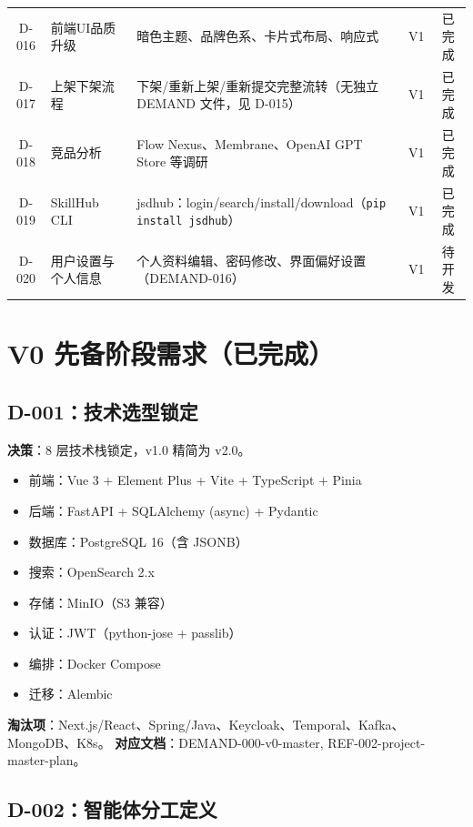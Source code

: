 \documentclass[11pt,a4paper]{article}
\begin{document}
\begin{table}[h]
\begin{tabular}{clp{4.5cm}cc}
D-016 & 前端UI品质升级 & 暗色主题、品牌色系、卡片式布局、响应式 & V1 & \textcolor{success}{已完成} \\
D-017 & 上架下架流程 & 下架/重新上架/重新提交完整流转（无独立 DEMAND 文件，见 D-015） & V1 & \textcolor{success}{已完成} \\
D-018 & 竞品分析 & Flow Nexus、Membrane、OpenAI GPT Store 等调研 & V1 & \textcolor{success}{已完成} \\
D-019 & SkillHub CLI & jsdhub：login/search/install/download（\texttt{pip install jsdhub}） & V1 & \textcolor{success}{已完成} \\
D-020 & 用户设置与个人信息 & 个人资料编辑、密码修改、界面偏好设置（DEMAND-016） & V1 & \textcolor{warning}{待开发} \\
\bottomrule
\end{tabular}
\end{table}

\section{V0 先备阶段需求（已完成）}

\subsection{D-001：技术选型锁定}

\textbf{决策}：8 层技术栈锁定，v1.0 精简为 v2.0。
\begin{itemize}[nosep]
  \item 前端：Vue 3 + Element Plus + Vite + TypeScript + Pinia
  \item 后端：FastAPI + SQLAlchemy (async) + Pydantic
  \item 数据库：PostgreSQL 16（含 JSONB）
  \item 搜索：OpenSearch 2.x
  \item 存储：MinIO（S3 兼容）
  \item 认证：JWT（python-jose + passlib）
  \item 编排：Docker Compose
  \item 迁移：Alembic
\end{itemize}
\textbf{淘汰项}：Next.js/React、Spring/Java、Keycloak、Temporal、Kafka、MongoDB、K8s。
\textbf{对应文档}：DEMAND-000-v0-master, REF-002-project-master-plan。

\subsection{D-002：智能体分工定义}
\end{document}
